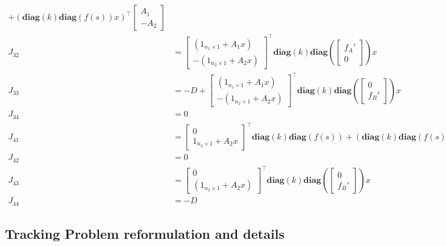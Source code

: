 \documentclass[3p,times]{article}
\newcommand{\diag}{\textbf{diag}}
\begin{document}
\begin{align}
+  (\diag(k)\diag(f(s))x)^\top \begin{bmatrix}A_1 \\ -A_2\end{bmatrix} \\
J_{32} &= \begin{bmatrix}\left(1_{n_1 \times 1} + A_1x\right)\\ -\left(1_{n_2 \times 1} + A_2x\right)\end{bmatrix}^\top \diag(k) \diag\left( \begin{bmatrix}
f_A' \\ 0\end{bmatrix}\right)x \\
J_{33} &= -D + \begin{bmatrix} \left(1_{n_1 \times 1} + A_1x\right) \\ -\left(1_{n_2\times 1}+ A_2x\right) \end{bmatrix}^\top \diag(k)\diag\left(
\begin{bmatrix}
0 \\ f_B'
\end{bmatrix}\right)x  \\
J_{34} &= 0 \\
J_{41} &= \begin{bmatrix}0 \\ 1_{n_2 \times 1} + A_2x \end{bmatrix}^\top\diag(k) \diag(f(s)) 
+ (\diag(k)\diag(f(s))x)^\top\begin{bmatrix} 
0 \\ A_2
\end{bmatrix} \\
J_{42} &= 0 \\
J_{43} &= \begin{bmatrix} 0 \\(1_{n_2\times 1} + A_2x) \end{bmatrix}^\top \diag(k) \diag\left(\begin{bmatrix}
0 \\ f_B'
\end{bmatrix}\right) x \\
J_{44} &= -D
\end{align}

\subsection{Tracking Problem reformulation and details}
\end{document}

